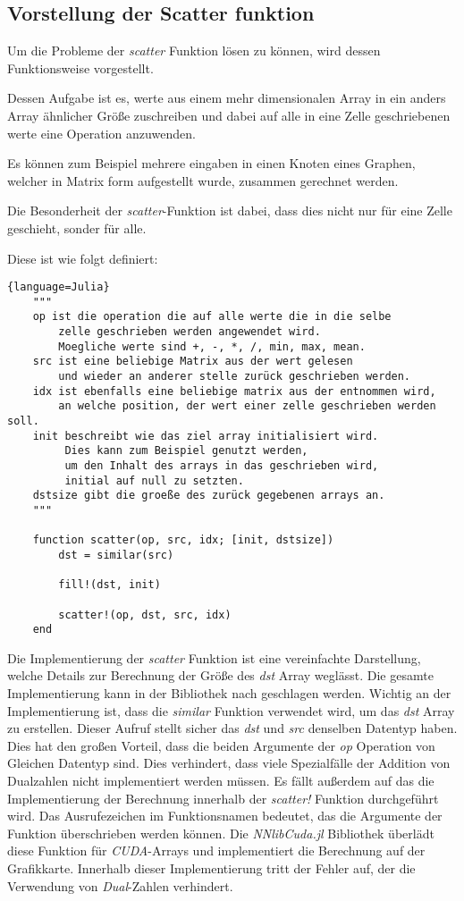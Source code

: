 \subsection{Vorstellung der Scatter funktion} \label{vorstellung}

Um die Probleme der \textit{scatter} Funktion lösen zu können, 
wird dessen Funktionsweise vorgestellt.

Dessen Aufgabe ist es, werte aus einem mehr dimensionalen Array 
in ein anders Array ähnlicher Größe zuschreiben 
und dabei auf alle in eine Zelle geschriebenen werte eine Operation anzuwenden.


Es können zum Beispiel mehrere eingaben in einen Knoten eines Graphen, 
welcher in Matrix form aufgestellt wurde,
zusammen gerechnet werden.

Die Besonderheit der \textit{scatter}-Funktion ist dabei, 
dass dies nicht nur für eine Zelle geschieht, sonder für alle.

Diese ist wie folgt definiert:

\begin{lstlisting}{language=Julia}
	"""
	op ist die operation die auf alle werte die in die selbe 
	    zelle geschrieben werden angewendet wird.
		Moegliche werte sind +, -, *, /, min, max, mean.
	src ist eine beliebige Matrix aus der wert gelesen 
	    und wieder an anderer stelle zurück geschrieben werden.
	idx ist ebenfalls eine beliebige matrix aus der entnommen wird,
	    an welche position, der wert einer zelle geschrieben werden soll.
	init beschreibt wie das ziel array initialisiert wird.
	     Dies kann zum Beispiel genutzt werden, 
		 um den Inhalt des arrays in das geschrieben wird, 
		 initial auf null zu setzten.
	dstsize gibt die groeße des zurück gegebenen arrays an.
	"""

	function scatter(op, src, idx; [init, dstsize])
		dst = similar(src)
		
		fill!(dst, init)
		
		scatter!(op, dst, src, idx)
	end
\end{lstlisting}

Die Implementierung der \textit{scatter} Funktion ist eine vereinfachte Darstellung, 
welche Details zur Berechnung der Größe des \textit{dst} Array weglässt.
Die gesamte Implementierung kann in der  Bibliothek \cite{} nach geschlagen werden.
Wichtig an der Implementierung ist, dass die \textit{similar} Funktion verwendet wird, um das
\textit{dst} Array zu erstellen.
Dieser Aufruf stellt sicher das \textit{dst} und \textit{src} denselben Datentyp haben.
Dies hat den großen Vorteil, 
dass die beiden Argumente der \textit{op} Operation von Gleichen Datentyp sind.
Dies verhindert, 
dass viele Spezialfälle der Addition von Dualzahlen nicht implementiert werden müssen.
Es fällt außerdem auf das die Implementierung der Berechnung innerhalb der \textit{scatter!} Funktion
durchgeführt wird.
Das Ausrufezeichen im Funktionsnamen bedeutet, das die Argumente der Funktion überschrieben werden können.
Die \textit{NNlibCuda.jl} Bibliothek überlädt diese Funktion für \textit{CUDA}-Arrays und
implementiert die Berechnung auf der Grafikkarte.
Innerhalb dieser Implementierung tritt der Fehler auf, der die Verwendung von \textit{Dual}-Zahlen
verhindert.